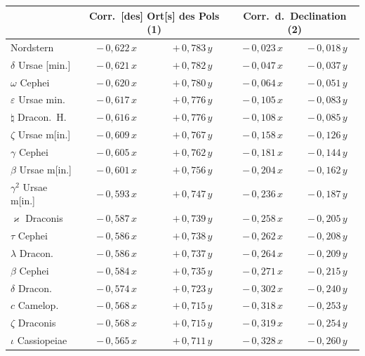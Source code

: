 \documentclass[12pt,a4paper]{article}
\theoremstyle{plain}
\theoremstyle{definition}
\theoremstyle{remark}
\begin{document}
\medskip
{\small
\begin{center}
\begin{tabular}{l|c c | c c}
\toprule
& \multicolumn{2}{c|}{Corr.\ [des] Ort[s] des Pols (1)} & \multicolumn{2}{c}{Corr.\ d.\ Declination (2)} \\
\midrule
Nordstern & $-\,0{,}622\,x$ & $+\,0{,}783\,y$ & $-\,0{,}023\,x$ & $-\,0{,}018\,y$ \\
$\delta$ Ursae [min.] & $-\,0{,}621\,x$ & $+\,0{,}782\,y$ & $-\,0{,}047\,x$ & $-\,0{,}037\,y$ \\
$\omega$ Cephei & $-\,0{,}620\,x$ & $+\,0{,}780\,y$ & $-\,0{,}064\,x$ & $-\,0{,}051\,y$ \\
$\varepsilon$ Ursae min. & $-\,0{,}617\,x$ & $+\,0{,}776\,y$ & $-\,0{,}105\,x$ & $-\,0{,}083\,y$ \\
$\natural$ Dracon.\ H. & $-\,0{,}616\,x$ & $+\,0{,}776\,y$ & $-\,0{,}108\,x$ & $-\,0{,}085\,y$ \\
\midrule
$\zeta$ Ursae m[in.] & $-\,0{,}609\,x$ & $+\,0{,}767\,y$ & $-\,0{,}158\,x$ & $-\,0{,}126\,y$ \\
$\gamma$ Cephei & $-\,0{,}605\,x$ & $+\,0{,}762\,y$ & $-\,0{,}181\,x$ & $-\,0{,}144\,y$ \\
$\beta$ Ursae m[in.] & $-\,0{,}601\,x$ & $+\,0{,}756\,y$ & $-\,0{,}204\,x$ & $-\,0{,}162\,y$ \\
$\gamma^2$ Ursae m[in.] & $-\,0{,}593\,x$ & $+\,0{,}747\,y$ & $-\,0{,}236\,x$ & $-\,0{,}187\,y$ \\
$\varkappa$ Draconis & $-\,0{,}587\,x$ & $+\,0{,}739\,y$ & $-\,0{,}258\,x$ & $-\,0{,}205\,y$ \\
\midrule
$\tau$ Cephei & $-\,0{,}586\,x$ & $+\,0{,}738\,y$ & $-\,0{,}262\,x$ & $-\,0{,}208\,y$ \\
$\lambda$ Dracon. & $-\,0{,}586\,x$ & $+\,0{,}737\,y$ & $-\,0{,}264\,x$ & $-\,0{,}209\,y$ \\
$\beta$ Cephei & $-\,0{,}584\,x$ & $+\,0{,}735\,y$ & $-\,0{,}271\,x$ & $-\,0{,}215\,y$ \\
$\delta$ Dracon. & $-\,0{,}574\,x$ & $+\,0{,}723\,y$ & $-\,0{,}302\,x$ & $-\,0{,}240\,y$ \\
$c$ Camelop. & $-\,0{,}568\,x$ & $+\,0{,}715\,y$ & $-\,0{,}318\,x$ & $-\,0{,}253\,y$ \\
\midrule
$\zeta$ Draconis & $-\,0{,}568\,x$ & $+\,0{,}715\,y$ & $-\,0{,}319\,x$ & $-\,0{,}254\,y$ \\
$\iota$ Cassiopeiae & $-\,0{,}565\,x$ & $+\,0{,}711\,y$ & $-\,0{,}328\,x$ & $-\,0{,}260\,y$ \\

\end{tabular}
\end{center}}
\end{document}
